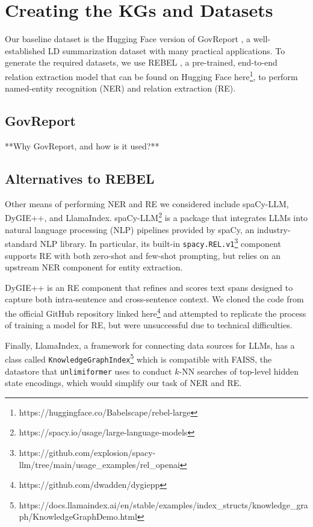 \documentclass[12pt]{article}
\begin{document}
\section{Creating the KGs and Datasets}
Our baseline dataset is the Hugging Face version of GovReport
\cite{huang2021efficient}, a well-established LD summarization dataset with
many practical applications. To generate the required datasets, we use REBEL
\cite{huguet2021rebel}, a pre-trained, end-to-end relation extraction model
that can be found on Hugging Face
here\footnote{https://huggingface.co/Babelscape/rebel-large}, to perform
named-entity recognition (NER) and relation extraction (RE).

\subsection*{GovReport}
**Why GovReport, and how is it used?**


\subsection*{Alternatives to REBEL}

Other means of performing NER and RE we considered include spaCy-LLM, DyGIE++,
and LlamaIndex. spaCy-LLM\footnote{https://spacy.io/usage/large-language-models}
is a package that integrates LLMs into natural language processing (NLP) pipelines
provided by spaCy, an industry-standard NLP library.
In particular, its built-in
\texttt{spacy.REL.v1}\footnote{https://github.com/explosion/spacy-llm/tree/main/usage\_examples/rel\_openai}
component supports RE with both zero-shot and few-shot prompting, but relies on an upstream NER component for entity extraction. 

DyGIE++ is an RE component that refines and scores text spans designed to
capture both intra-sentence and cross-sentence context. We cloned the code from
the official GitHub repository linked
here\footnote{https://github.com/dwadden/dygiepp} and attempted to replicate
the process of training a model for RE, but were unsuccessful due to technical
difficulties. 

Finally, LlamaIndex, a framework for connecting data sources for LLMs, has a class called \texttt{KnowledgeGraphIndex}\footnote{https://docs.llamaindex.ai/en/stable/examples/index\_structs/knowledge\_graph/KnowledgeGraphDemo.html} which is compatible with FAISS, the datastore that \texttt{unlimiformer} uses to conduct $k$-NN searches of top-level hidden state encodings, which would simplify our task of NER and RE.
\end{document}
